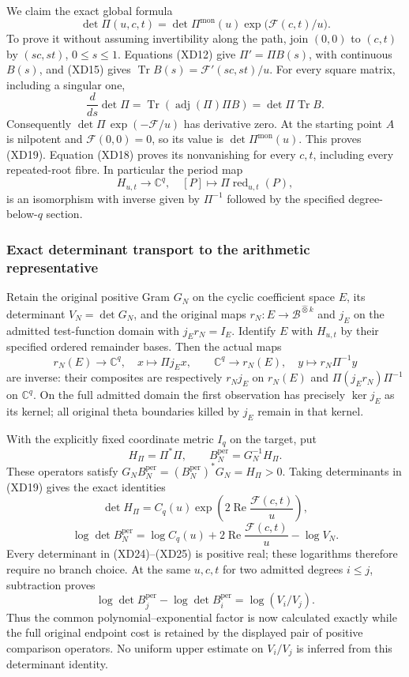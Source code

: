 We claim the exact global formula
\[
 \boxed{\det\Pi(u,c,t)=\det\Pi^{\mathrm{mon}}(u)
                 \exp\bigl(\mathcal F(c,t)/u\bigr).}
 \tag{XD19}
\]
To prove it without assuming invertibility along the path, join
$(0,0)$ to $(c,t)$ by $(sc,st)$, $0\leq s\leq1$.
Equations (XD12) give $\Pi'=\Pi B(s)$, with continuous $B(s)$,
and (XD15) gives $\operatorname{Tr}B(s)=\mathcal F'(sc,st)/u$.
For every square matrix, including a singular one,
\[
 \frac{d}{ds}\det\Pi
 =\operatorname{Tr}(\operatorname{adj}(\Pi)\Pi B)
 =\det\Pi\operatorname{Tr}B.
 \tag{XD20}
\]
Consequently $\det\Pi\,\exp(-\mathcal F/u)$ has derivative zero.
At the starting point $A$ is nilpotent and $\mathcal F(0,0)=0$,
so its value is $\det\Pi^{\mathrm{mon}}(u)$. This proves (XD19).
Equation (XD18) proves its nonvanishing for every $c,t$, including
every repeated-root fibre. In particular the period map
\[
 H_{u,t}\longrightarrow\mathbb C^q,
 \quad[P]\longmapsto\Pi\operatorname{red}_{u,t}(P),
 \tag{XD21}
\]
is an isomorphism with inverse given by $\Pi^{-1}$ followed by
the specified degree-below-$q$ section.

\subsubsection{Exact determinant transport to the arithmetic representative}

Retain the original positive Gram $G_N$ on the cyclic coefficient
space $E$, its determinant $V_N=\det G_N$, and the original maps
$r_N:E\longrightarrow\mathscr B^{\widehat\otimes k}$ and
$j_E$ on the admitted test-function domain with $j_Er_N=I_E$.
Identify $E$ with $H_{u,t}$ by their specified ordered remainder
bases. Then the actual maps
\[
 r_N(E)\longrightarrow\mathbb C^q,\quad x\longmapsto\Pi j_Ex,
 \qquad
 \mathbb C^q\longrightarrow r_N(E),\quad y\longmapsto r_N\Pi^{-1}y
 \tag{XD22}
\]
are inverse: their composites are respectively $r_Nj_E$ on
$r_N(E)$ and $\Pi(j_Er_N)\Pi^{-1}$ on $\mathbb C^q$.
On the full admitted domain the first observation has precisely
$\ker j_E$ as its kernel; all original theta boundaries killed by
$j_E$ remain in that kernel.

With the explicitly fixed coordinate metric $I_q$ on the target,
put
\[
 H_\Pi=\Pi^*\Pi,\qquad B_N^{\mathrm{per}}=G_N^{-1}H_\Pi.
 \tag{XD23}
\]
These operators satisfy
$G_NB_N^{\mathrm{per}}=(B_N^{\mathrm{per}})^*G_N=H_\Pi>0$.
Taking determinants in (XD19) gives the exact identities
\[
 \det H_\Pi=C_q(u)
       \exp\!\left(2\operatorname{Re}\frac{\mathcal F(c,t)}u\right),
 \tag{XD24}
\]
\[
 \boxed{\log\det B_N^{\mathrm{per}}
 =\log C_q(u)+2\operatorname{Re}\frac{\mathcal F(c,t)}u-\log V_N.}
 \tag{XD25}
\]
Every determinant in (XD24)--(XD25) is positive real; these
logarithms therefore require no branch choice. At the same $u,c,t$
for two admitted degrees $i\leq j$, subtraction proves
\[
 \boxed{\log\det B_j^{\mathrm{per}}-
        \log\det B_i^{\mathrm{per}}=\log(V_i/V_j).}
 \tag{XD26}
\]
Thus the common polynomial--exponential factor is now calculated
exactly while the full original endpoint cost is retained by the
displayed pair of positive comparison operators. No uniform upper
estimate on $V_i/V_j$ is inferred from this determinant identity.


\endgroup
